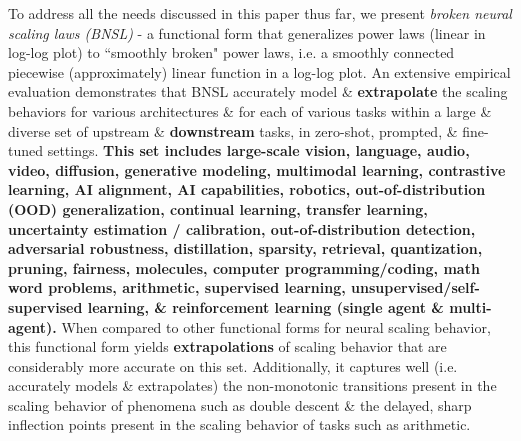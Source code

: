 \documentclass{article} %
\begin{document}
To address all the needs discussed in this paper thus far,  we present {\it broken neural scaling laws (BNSL)} - a functional form that generalizes power laws (linear in  log-log plot) %
to ``smoothly broken" power laws, i.e. a smoothly connected piecewise (approximately) linear function in a log-log plot.  An extensive empirical evaluation demonstrates that BNSL accurately model \& \textbf{extrapolate} the scaling behaviors for various architectures \& for each of various tasks within a large \& diverse set of upstream \& \textbf{downstream} tasks, in zero-shot, prompted, \& fine-tuned settings. \textbf{This set includes large-scale vision, language, audio, video, diffusion, generative modeling, multimodal learning, contrastive learning, AI alignment, AI capabilities, robotics, out-of-distribution (OOD) generalization, continual learning, transfer learning, uncertainty estimation / calibration, out-of-distribution detection, adversarial robustness, distillation, sparsity, retrieval, quantization, pruning, fairness, molecules, computer programming/coding, math word problems, arithmetic, supervised learning, unsupervised/self-supervised learning, \& reinforcement learning (single agent \& multi-agent).}
When compared to other functional forms for neural scaling behavior, this functional form yields \textbf{extrapolations} of scaling behavior that are considerably more accurate on this set. Additionally, it captures well (i.e. accurately models \& extrapolates) the non-monotonic transitions present in the scaling behavior of phenomena such as double descent \& the delayed, sharp inflection points present in the scaling behavior of tasks such as arithmetic.


\end{document}
